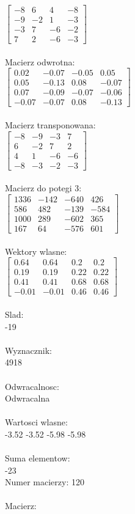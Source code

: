 \documentclass[a4paper,12pt]{article}
\begin{document}
$\begin{bmatrix} -8&6&4&-8\\-9&-2&1&-3\\-3&7&-6&-2\\7&2&-6&-3 \end{bmatrix}$
\\
\\
Macierz odwrotna:\\

$\begin{bmatrix} 0.02&-0.07&-0.05&0.05\\0.05&-0.13&0.08&-0.07\\0.07&-0.09&-0.07&-0.06\\-0.07&-0.07&0.08&-0.13 \end{bmatrix}$
\\
\\
Macierz transponowana:\\

$\begin{bmatrix} -8&-9&-3&7\\6&-2&7&2\\4&1&-6&-6\\-8&-3&-2&-3 \end{bmatrix}$
\\
\\
Macierz do potegi 3:\\

$\begin{bmatrix} 1336&-142&-640&426\\586&482&-139&-584\\1000&289&-602&365\\167&64&-576&601 \end{bmatrix}$
\\
\\
Wektory wlasne:\\

$\begin{bmatrix} 0.64&0.64&0.2&0.2\\0.19&0.19&0.22&0.22\\0.41&0.41&0.68&0.68\\-0.01&-0.01&0.46&0.46 \end{bmatrix}$
\\
\\
Slad:\\
-19
\\
\\
Wyznacznik:\\
4918
\\
\\
Odwracalnosc:\\
Odwracalna
\\
\\
Wartosci wlasne:\\
-3.52 -3.52 -5.98 -5.98
\\
\\
Suma elementow:\\
-23
\\
\newpage
Numer macierzy:
120
\\
\\
Macierz:\\
\end{document}
